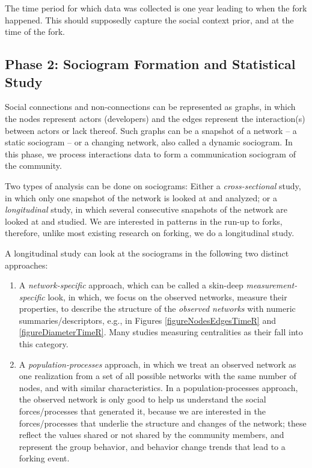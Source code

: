 \documentclass[11pt]{report}
\begin{document}
The time period for which data was collected is one year leading to when the fork happened. This should supposedly capture the social context prior, and at the time of the fork.

\subsection{Phase 2: Sociogram Formation and Statistical Study}

Social connections and non-connections can be represented as graphs, in which the nodes represent actors (developers) and the edges represent the interaction(s) between actors or lack thereof. Such graphs can be a snapshot of a network -- a static sociogram -- or a changing network, also called a dynamic sociogram. In this phase, we process interactions data to form a communication sociogram of the community. 

Two types of analysis can be done on sociograms: Either a \textit{cross-sectional} study, in which only one snapshot of the network is looked at and analyzed; or a \textit{longitudinal} study, in which several consecutive snapshots of the network are looked at and studied.  We are interested in patterns in the run-up to forks, therefore, unlike most existing research on forking, we do a longitudinal study.

A longitudinal study can look at the sociograms in the following two distinct approaches: 
\begin{enumerate}
\item A \textit{network-specific} approach, which can be called a skin-deep \textit{measurement-specific} look, in which, we focus on the observed networks, measure their properties, to describe the structure of the \textit{observed networks} with numeric summaries/descriptors, e.g., in Figures \ref{figureNodesEdgesTimeR} and \ref{figureDiameterTimeR}. Many studies measuring centralities as their fall into this category. 

\item A \textit{population-processes} approach, in which we treat an observed network as one realization from a set of all possible networks with the same number of nodes, and with similar characteristics. In a population-processes approach, the observed network is only good to help us understand the social forces/processes that generated it, because we are interested in the forces/processes that underlie the structure and changes of the network; these reflect the values shared or not shared by the community members, and represent the group behavior, and behavior change trends that lead to a forking event. 

\end{enumerate}
\end{document}

